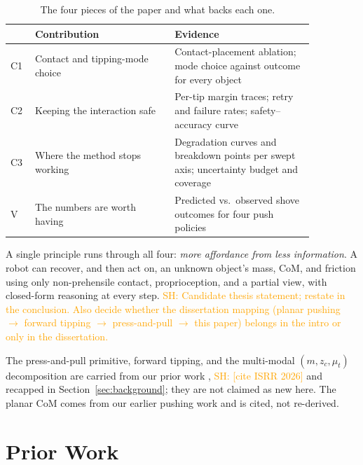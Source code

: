 \documentclass[10pt, conference]{IEEEtran}
\newcommand{\sh}[1]{\textcolor{orange}{SH: #1}}
\newcommand{\isrr}{\sh{[cite ISRR 2026]}}
\newcommand{\iros}{\cite{hyland_before_2026}}
\begin{document}
\begin{table}[t]
  \centering
  \caption{The four pieces of the paper and what backs each one.}
  \label{tab:contributions}
  \small
  \begin{tabular}{p{0.06\linewidth} p{0.40\linewidth} p{0.40\linewidth}}
    \toprule
    & \textbf{Contribution} & \textbf{Evidence} \\
    \midrule
    C1 & Contact and tipping-mode choice & Contact-placement ablation; mode choice against outcome for every object \\
    C2 & Keeping the interaction safe & Per-tip margin traces; retry and failure rates; safety--accuracy curve \\
    C3 & Where the method stops working & Degradation curves and breakdown points per swept axis; uncertainty budget and coverage \\
    V & The numbers are worth having & Predicted vs.\ observed shove outcomes for four push policies \\
    \bottomrule
  \end{tabular}
\end{table}

A single principle runs through all four: \emph{more affordance from less information}. A robot can recover, and then act on, an unknown object's mass, CoM, and friction using only non-prehensile contact, proprioception, and a partial view, with closed-form reasoning at every step. \sh{Candidate thesis statement; restate in the conclusion. Also decide whether the dissertation mapping (planar pushing $\rightarrow$ forward tipping $\rightarrow$ press-and-pull $\rightarrow$ this paper) belongs in the intro or only in the dissertation.}

The press-and-pull primitive, forward tipping, and the multi-modal $(m, z_c, \mu_t)$ decomposition are carried from our prior work \iros{}, \isrr{} and recapped in Section~\ref{sec:background}; they are not claimed as new here. The planar CoM comes from our earlier pushing work \cite{hyland_predicting_2023, hyland_onboard_2025} and is cited, not re-derived.

\section{Prior Work} \label{sec:prior}
\end{document}
